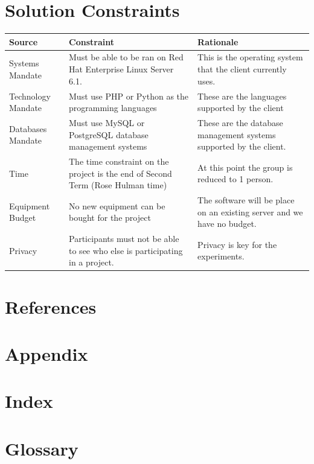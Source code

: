 \section{Solution Constraints}
\begin{table}[!h]
    \begin{tabular}{|l|p{5.5cm}|p{5.5cm}|}
        \hline
        Source & Constraint & Rationale \\
        \hline
        Systems Mandate & Must be able to be ran on Red Hat Enterprise Linux Server 6.1. & This is the operating system that the client currently uses. \\
        \hline
        Technology Mandate & Must use PHP or Python as the programming languages & These are the languages supported by the client \\
        \hline
        Databases Mandate & Must use MySQL or PostgreSQL database management systems & These are the database management systems supported by the client. \\
        \hline
        Time  & The time constraint on the project is the end of Second Term (Rose Hulman time) & At this point the group is reduced to 1 person. \\
        \hline
        Equipment Budget & No new equipment can be bought for the project & The software will be place on an existing server and we have no budget. \\
        \hline
        Privacy & Participants must not be able to see who else is participating in a project. & Privacy is key for the experiments. \\
        \hline
    \end{tabular}
\end{table}

\section{References}
\section{Appendix}
\section{Index}
\section{Glossary}


